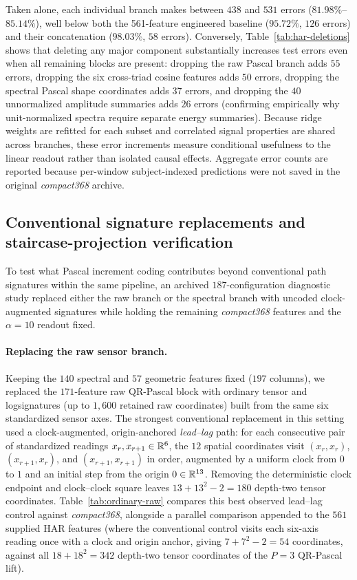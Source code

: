 Taken alone, each individual branch makes between \(438\) and \(531\) errors
(\(81.98\%\)--\(85.14\%\)), well below both the 561-feature engineered baseline
(\(95.72\%\), \(126\) errors) and their concatenation (\(98.03\%\), \(58\)
errors). Conversely, Table~\ref{tab:har-deletions} shows that deleting any major
component substantially increases test errors even when all remaining blocks are
present: dropping the raw Pascal branch adds \(55\) errors, dropping the six
cross-triad cosine features adds \(50\) errors, dropping the spectral Pascal
shape coordinates adds \(37\) errors, and dropping the \(40\) unnormalized
amplitude summaries adds \(26\) errors (confirming empirically why unit-normalized
spectra require separate energy summaries). Because ridge weights are refitted
for each subset and correlated signal properties are shared across branches,
these error increments measure conditional usefulness to the linear readout
rather than isolated causal effects. Aggregate error counts are reported because
per-window subject-indexed predictions were not saved in the original
\emph{compact368} archive.

\subsection{Conventional signature replacements and staircase-projection verification}
To test what Pascal increment coding contributes beyond conventional path
signatures within the same pipeline, an archived \(187\)-configuration diagnostic
study replaced either the raw branch or the spectral branch with uncoded
clock-augmented signatures while holding the remaining \emph{compact368} features
and the \(\alpha = 10\) readout fixed.

\paragraph{Replacing the raw sensor branch.}
Keeping the \(140\) spectral and \(57\) geometric features fixed (\(197\)
columns), we replaced the \(171\)-feature raw QR-Pascal block with ordinary
tensor and logsignatures (up to \(1{,}600\) retained raw coordinates) built from
the same six standardized sensor axes. The strongest conventional replacement in
this setting used a clock-augmented, origin-anchored \emph{lead--lag} path: for
each consecutive pair of standardized readings \(x_r, x_{r+1} \in \mathbb{R}^6\), the
\(12\) spatial coordinates visit \((x_r, x_r)\), \((x_{r+1}, x_r)\), and
\((x_{r+1}, x_{r+1})\) in order, augmented by a uniform clock from \(0\) to \(1\)
and an initial step from the origin \(0 \in \mathbb{R}^{13}\). Removing the deterministic
clock endpoint and clock--clock square leaves \(13 + 13^2 - 2 = 180\) depth-two
tensor coordinates. Table~\ref{tab:ordinary-raw} compares this best observed
lead--lag control against \emph{compact368}, alongside a parallel comparison
appended to the \(561\) supplied HAR features (where the conventional control
visits each six-axis reading once with a clock and origin anchor, giving
\(7 + 7^2 - 2 = 54\) coordinates, against all \(18 + 18^2 = 342\) depth-two
tensor coordinates of the \(P = 3\) QR-Pascal lift).

